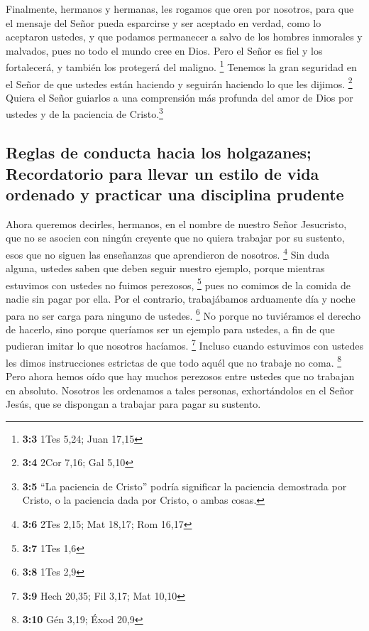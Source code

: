  Finalmente, hermanos y hermanas, les rogamos que oren por
nosotros, para que el mensaje del Señor pueda esparcirse y ser aceptado
en verdad, como lo aceptaron ustedes,  y que podamos
permanecer a salvo de los hombres inmorales y malvados, pues no todo el
mundo cree en Dios.  Pero el Señor es fiel y los
fortalecerá, y también los protegerá del maligno. \footnote{\textbf{3:3}
  1Tes 5,24; Juan 17,15}  Tenemos la gran seguridad en el
Señor de que ustedes están haciendo y seguirán haciendo lo que les
dijimos. \footnote{\textbf{3:4} 2Cor 7,16; Gal 5,10} 
Quiera el Señor guiarlos a una comprensión más profunda del amor de Dios
por ustedes y de la paciencia de Cristo.\footnote{\textbf{3:5} ``La
  paciencia de Cristo'' podría significar la paciencia demostrada por
  Cristo, o la paciencia dada por Cristo, o ambas cosas.}

\hypertarget{reglas-de-conducta-hacia-los-holgazanes-recordatorio-para-llevar-un-estilo-de-vida-ordenado-y-practicar-una-disciplina-prudente}{%
\subsection{Reglas de conducta hacia los holgazanes; Recordatorio para
llevar un estilo de vida ordenado y practicar una disciplina
prudente}\label{reglas-de-conducta-hacia-los-holgazanes-recordatorio-para-llevar-un-estilo-de-vida-ordenado-y-practicar-una-disciplina-prudente}}

 Ahora queremos decirles, hermanos, en el nombre de
nuestro Señor Jesucristo, que no se asocien con ningún creyente que no
quiera trabajar por su sustento, esos que no siguen las enseñanzas que
aprendieron de nosotros. \footnote{\textbf{3:6} 2Tes 2,15; Mat 18,17;
  Rom 16,17}  Sin duda alguna, ustedes saben que deben
seguir nuestro ejemplo, porque mientras estuvimos con ustedes no fuimos
perezosos, \footnote{\textbf{3:7} 1Tes 1,6}  pues no
comimos de la comida de nadie sin pagar por ella. Por el contrario,
trabajábamos arduamente día y noche para no ser carga para ninguno de
ustedes. \footnote{\textbf{3:8} 1Tes 2,9}  No porque no
tuviéramos el derecho de hacerlo, sino porque queríamos ser un ejemplo
para ustedes, a fin de que pudieran imitar lo que nosotros hacíamos.
\footnote{\textbf{3:9} Hech 20,35; Fil 3,17; Mat 10,10} 
Incluso cuando estuvimos con ustedes les dimos instrucciones estrictas
de que todo aquél que no trabaje no coma. \footnote{\textbf{3:10} Gén
  3,19; Éxod 20,9}  Pero ahora hemos oído que hay muchos
perezosos entre ustedes que no trabajan en absoluto. 
Nosotros les ordenamos a tales personas, exhortándolos en el Señor
Jesús, que se dispongan a trabajar para pagar su sustento.

